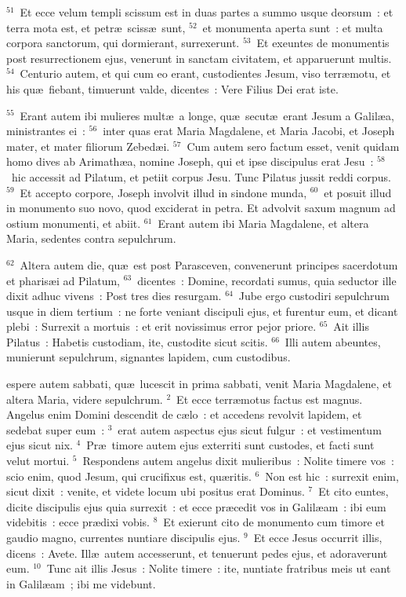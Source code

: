 ${}^{51}$~Et ecce velum templi scissum est in duas partes a summo usque deorsum~: et terra mota est, et petr\ae\ sciss\ae\ sunt,
${}^{52}$~et monumenta aperta sunt~: et multa corpora sanctorum, qui dormierant, surrexerunt.
${}^{53}$~Et exeuntes de monumentis post resurrectionem ejus, venerunt in sanctam civitatem, et apparuerunt multis.
${}^{54}$~Centurio autem, et qui cum eo erant, custodientes Jesum, viso terr\ae motu, et his qu\ae\ fiebant, timuerunt valde, dicentes~: Vere Filius Dei erat iste.


${}^{55}$~Erant autem ibi mulieres mult\ae\ a longe, qu\ae\ secut\ae\ erant Jesum a Galil\ae a, ministrantes ei~:
${}^{56}$~inter quas erat Maria Magdalene, et Maria Jacobi, et Joseph mater, et mater filiorum Zebed\ae i.
${}^{57}$~Cum autem sero factum esset, venit quidam homo dives ab Arimath\ae a, nomine Joseph, qui et ipse discipulus erat Jesu~:
${}^{58}$~hic accessit ad Pilatum, et petiit corpus Jesu. Tunc Pilatus jussit reddi corpus.
${}^{59}$~Et accepto corpore, Joseph involvit illud in sindone munda,
${}^{60}$~et posuit illud in monumento suo novo, quod exciderat in petra. Et advolvit saxum magnum ad ostium monumenti, et abiit.
${}^{61}$~Erant autem ibi Maria Magdalene, et altera Maria, sedentes contra sepulchrum.


${}^{62}$~Altera autem die, qu\ae\ est post Parasceven, convenerunt principes sacerdotum et pharis\ae i ad Pilatum,
${}^{63}$~dicentes~: Domine, recordati sumus, quia seductor ille dixit adhuc vivens~: Post tres dies resurgam.
${}^{64}$~Jube ergo custodiri sepulchrum usque in diem tertium~: ne forte veniant discipuli ejus, et furentur eum, et dicant plebi~: Surrexit a mortuis~: et erit novissimus error pejor priore.
${}^{65}$~Ait illis Pilatus~: Habetis custodiam, ite, custodite sicut scitis.
${}^{66}$~Illi autem abeuntes, munierunt sepulchrum, signantes lapidem, cum custodibus.

\bchapter
{}espere autem sabbati, qu\ae\ lucescit in prima sabbati, venit Maria Magdalene, et altera Maria, videre sepulchrum.
${}^{2}$~Et ecce terr\ae motus factus est magnus. Angelus enim Domini descendit de c\ae lo~: et accedens revolvit lapidem, et sedebat super eum~:
${}^{3}$~erat autem aspectus ejus sicut fulgur~: et vestimentum ejus sicut nix.
${}^{4}$~Pr\ae\ timore autem ejus exterriti sunt custodes, et facti sunt velut mortui.
${}^{5}$~Respondens autem angelus dixit mulieribus~: Nolite timere vos~: scio enim, quod Jesum, qui crucifixus est, qu\ae ritis.
${}^{6}$~Non est hic~: surrexit enim, sicut dixit~: venite, et videte locum ubi positus erat Dominus.
${}^{7}$~Et cito euntes, dicite discipulis ejus quia surrexit~: et ecce pr\ae cedit vos in Galil\ae am~: ibi eum videbitis~: ecce pr\ae dixi vobis.
${}^{8}$~Et exierunt cito de monumento cum timore et gaudio magno, currentes nuntiare discipulis ejus.
${}^{9}$~Et ecce Jesus occurrit illis, dicens~: Avete. Ill\ae\ autem accesserunt, et tenuerunt pedes ejus, et adoraverunt eum.
${}^{10}$~Tunc ait illis Jesus~: Nolite timere~: ite, nuntiate fratribus meis ut eant in Galil\ae am~; ibi me videbunt.


